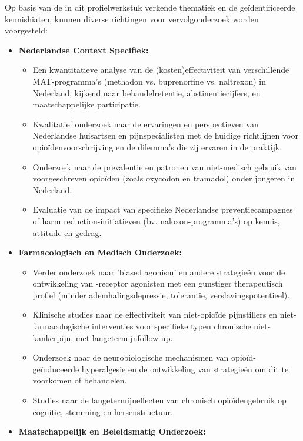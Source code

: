 \documentclass[11pt, a4paper]{report} %
\begin{document}
Op basis van de in dit profielwerkstuk verkende thematiek en de geïdentificeerde kennishiaten, kunnen diverse richtingen voor vervolgonderzoek worden voorgesteld:
\begin{itemize}
    \item \textbf{Nederlandse Context Specifiek:}
        \begin{itemize}
            \item Een kwantitatieve analyse van de (kosten)effectiviteit van verschillende MAT-programma's (methadon vs. buprenorfine vs. naltrexon) in Nederland, kijkend naar behandelretentie, abstinentiecijfers, en maatschappelijke participatie.
            \item Kwalitatief onderzoek naar de ervaringen en perspectieven van Nederlandse huisartsen en pijnspecialisten met de huidige richtlijnen voor opioïdenvoorschrijving en de dilemma's die zij ervaren in de praktijk.
            \item Onderzoek naar de prevalentie en patronen van niet-medisch gebruik van voorgeschreven opioïden (zoals oxycodon en tramadol) onder jongeren in Nederland.
            \item Evaluatie van de impact van specifieke Nederlandse preventiecampagnes of harm reduction-initiatieven (bv. naloxon-programma's) op kennis, attitude en gedrag.
        \end{itemize}
    \item \textbf{Farmacologisch en Medisch Onderzoek:}
        \begin{itemize}
            \item Verder onderzoek naar 'biased agonism' en andere strategieën voor de ontwikkeling van \textmu-receptor agonisten met een gunstiger therapeutisch profiel (minder ademhalingsdepressie, tolerantie, verslavingspotentieel).
            \item Klinische studies naar de effectiviteit van niet-opioïde pijnstillers en niet-farmacologische interventies voor specifieke typen chronische niet-kankerpijn, met langetermijnfollow-up.
            \item Onderzoek naar de neurobiologische mechanismen van opioïd-geïnduceerde hyperalgesie en de ontwikkeling van strategieën om dit te voorkomen of behandelen.
            \item Studies naar de langetermijneffecten van chronisch opioïdengebruik op cognitie, stemming en hersenstructuur.
        \end{itemize}
    \item \textbf{Maatschappelijk en Beleidsmatig Onderzoek:}

\end{itemize}
\end{document}
